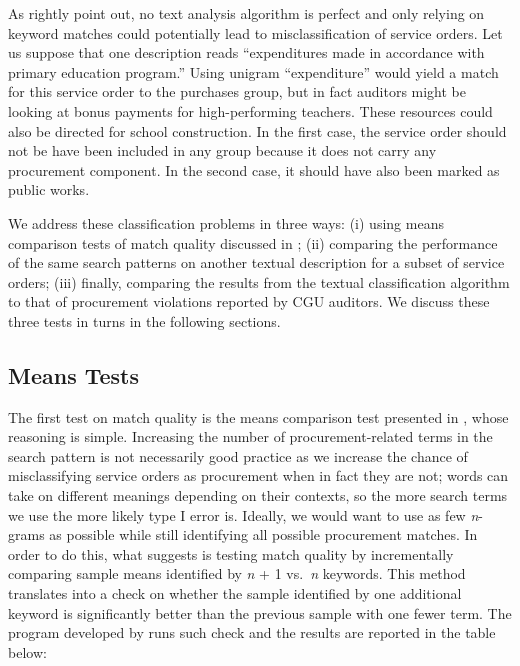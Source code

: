 \documentclass[11pt]{article}
\begin{document}
As \citet{GrimmerTextDataPromise2013a} rightly point out, no text analysis algorithm is perfect and only relying on keyword matches could potentially lead to misclassification of service orders. Let us suppose that one description reads ``expenditures made in accordance with primary education program.'' Using unigram ``expenditure'' would yield a match for this service order to the purchases group, but in fact auditors might be looking at bonus payments for high-performing teachers. These resources could also be directed for school construction. In the first case, the service order should not be have been included in any group because it does not carry any procurement component. In the second case, it should have also been marked as public works.

We address these classification problems in three ways: (i) using means comparison tests of match quality discussed in \citet{AssumpcaotextfindDataDrivenText2018}; (ii) comparing the performance of the same search patterns on another textual description for a subset of service orders; (iii) finally, comparing the results from the textual classification algorithm to that of procurement violations reported by CGU auditors. We discuss these three tests in turns in the following sections.

\subsection{Means Tests}\label{subsec:quality1}

The first test on match quality is the means comparison test presented in \citet{AssumpcaotextfindDataDrivenText2018}, whose reasoning is simple. Increasing the number of procurement-related terms in the search pattern is not necessarily good practice as we increase the chance of misclassifying service orders as procurement when in fact they are not; words can take on different meanings depending on their contexts, so the more search terms we use the more likely type I error is. Ideally, we would want to use as few \emph{n}-grams as possible while still identifying all possible procurement matches. In order to do this, what \citet{AssumpcaotextfindDataDrivenText2018} suggests is testing match quality by incrementally comparing sample means identified by \emph{n} + 1 vs.~\emph{n} keywords. This method translates into a check on whether the sample identified by one additional keyword is significantly better than the previous sample with one fewer term. The program developed by \citet{AssumpcaotextfindDataDrivenText2018} runs such check and the results are reported in the table below:

\end{document}
